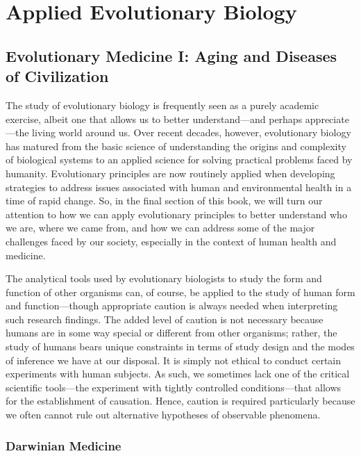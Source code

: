 \documentclass[
]{book}
\begin{document}
\hypertarget{part-applied-evolutionary-biology}{%
\part{Applied Evolutionary Biology}\label{part-applied-evolutionary-biology}}

\hypertarget{evolutionary-medicine-i-aging-and-diseases-of-civilization}{%
\chapter{Evolutionary Medicine I: Aging and Diseases of Civilization}\label{evolutionary-medicine-i-aging-and-diseases-of-civilization}}

The study of evolutionary biology is frequently seen as a purely academic exercise, albeit one that allows us to better understand---and perhaps appreciate---the living world around us. Over recent decades, however, evolutionary biology has matured from the basic science of understanding the origins and complexity of biological systems to an applied science for solving practical problems faced by humanity. Evolutionary principles are now routinely applied when developing strategies to address issues associated with human and environmental health in a time of rapid change. So, in the final section of this book, we will turn our attention to how we can apply evolutionary principles to better understand who we are, where we came from, and how we can address some of the major challenges faced by our society, especially in the context of human health and medicine.

The analytical tools used by evolutionary biologists to study the form and function of other organisms can, of course, be applied to the study of human form and function---though appropriate caution is always needed when interpreting such research findings. The added level of caution is not necessary because humans are in some way special or different from other organisms; rather, the study of humans bears unique constraints in terms of study design and the modes of inference we have at our disposal. It is simply not ethical to conduct certain experiments with human subjects. As such, we sometimes lack one of the critical scientific tools---the experiment with tightly controlled conditions---that allows for the establishment of causation. Hence, caution is required particularly because we often cannot rule out alternative hypotheses of observable phenomena.

\hypertarget{darwinian-medicine}{%
\section{Darwinian Medicine}\label{darwinian-medicine}}
\end{document}
